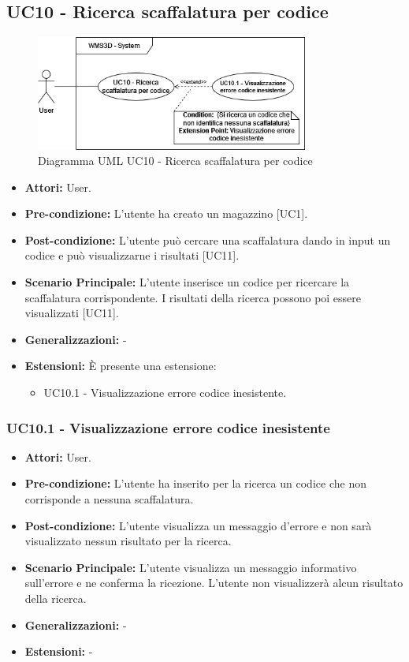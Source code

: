 \subsection{UC10 - Ricerca scaffalatura per codice}
\begin{figure}[H]
  \centering
  \includegraphics[width=0.8\textwidth]{UC_diagrams_1-10/UC10.drawio.png}
   \caption{Diagramma UML UC10 - Ricerca scaffalatura per codice}
\end{figure}
\begin{itemize}
    \item \textbf{Attori:} User.
    \item \textbf{Pre-condizione:} L'utente ha creato un magazzino [UC1].
    \item \textbf{Post-condizione:} L'utente può cercare una scaffalatura dando in input un codice e può visualizzarne i risultati [UC11].
    \item \textbf{Scenario Principale:} L'utente inserisce un codice per ricercare la scaffalatura corrispondente. I risultati della ricerca possono poi essere visualizzati [UC11].
    \item \textbf{Generalizzazioni:} -
    \item \textbf{Estensioni:} È presente una estensione:
    \begin{itemize}
        \item UC10.1 - Visualizzazione errore codice inesistente.
    \end{itemize}
\end{itemize}


\subsubsection{UC10.1 - Visualizzazione errore codice inesistente}
\begin{itemize}
    \item \textbf{Attori:} User.
    \item \textbf{Pre-condizione:}  L'utente ha inserito per la ricerca un codice che non corrisponde a nessuna scaffalatura.
    \item \textbf{Post-condizione:}  L'utente visualizza un messaggio d'errore e non sarà visualizzato nessun risultato per la ricerca.
    \item \textbf{Scenario Principale:}  L'utente visualizza un messaggio informativo sull'errore e ne conferma la ricezione. L'utente non visualizzerà alcun risultato della ricerca.
    \item \textbf{Generalizzazioni:} -
    \item \textbf{Estensioni:} -
\end{itemize}
